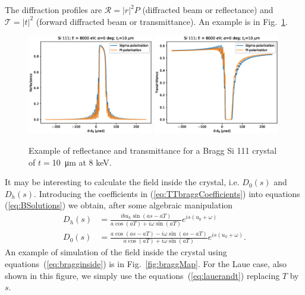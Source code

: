 \documentclass[preprint]{iucr}              %
\newcommand{\inblue}[1]{{\color{blue}#1}}
\newcommand{\inred}[1]{{\color{red}#1}}
\begin{document}
The diffraction profiles are $\mathcal{R}=|r|^2 P$ (diffracted beam or reflectance) and $\mathcal{T}=|t|^2$ (forward diffracted beam or transmittance).
An example is in Fig.~\ref{fig:braggProfiles}. 

\begin{figure}\label{fig:braggProfiles}
    \centering
    \includegraphics[width=0.49\textwidth]{figures/Bragg_1.eps}
    \includegraphics[width=0.49\textwidth]{figures/Bragg_2.eps}
    \caption{Example of reflectance and transmittance for a Bragg Si 111 crystal of $t=$\SI{10}{\micro\meter} at 8 keV. }
\end{figure}

\inred{
It may be interesting to calculate the field inside the crystal, i.e. $D_0(s)$ and $D_h(s)$. Introducing the coefficients in (\ref{eq:TTbraggCoefficients}) into equations (\ref{eq:BSolutions}) we obtain, after some algebraic manipulation
\begin{subequations}\label{eq:bragginside}
\begin{align}
D_h(s)&=\frac{i b u_h \sin(as - aT)}{a \cos(aT) + i \omega \sin(aT)} e^{is(u_0+\omega)}\\
D_0(s)&= \frac{a \cos(as-aT) - i \omega \sin(as-aT)}{a \cos(aT) + i \omega \sin(aT)} e^{is(u_0+\omega)}.
\end{align}
\end{subequations}
}
\inblue{
An example of simulation of the field inside the crystal using equations~(\ref{eq:bragginside}) is in Fig.~\ref{fig:braggMap}. For the Laue case, also shown in this figure, we simply use the equations~(\ref{eq:lauerandt}) replacing $T$ by $s$. 
}
\end{document}

